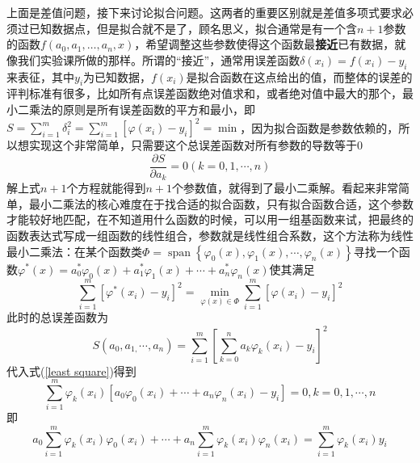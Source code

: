 \documentclass[12pt,a4paper,openany,twoside]{book}
\numberwithin{equation}{section}
\begin{document}
            上面是差值问题，接下来讨论拟合问题。这两者的重要区别就是差值多项式要求必须过已知数据点，但是拟合就不是了，顾名思义，拟合通常是有一个含$n+1$参数的函数$f(a_0,a_1,\dots,a_n,x)$，希望调整这些参数使得这个函数最\textbf{接近}已有数据，就像我们实验课所做的那样。所谓的“接近”，通常用误差函数$\delta(x_i)=f(x_i)-y_i$来表征，其中$y_i$为已知数据，$f(x_i)$是拟合函数在这点给出的值，而整体的误差的评判标准有很多，比如所有点误差函数绝对值求和，或者绝对值中最大的那个，最小二乘法的原则是所有误差函数的平方和最小，即$S=\sum_{i=1}^{m} \delta_{i}^{2}=\sum_{i=1}^{m}\left[\varphi\left(x_{i}\right)-y_{i}\right]^{2}=\min$，因为拟合函数是参数依赖的，所以想实现这个非常简单，只需要这个总误差函数对所有参数的导数等于0
            \begin{equation}
              \frac{\partial S}{\partial a_{k}}=0 (k=0,1, \cdots, n)
              \label{least square}
            \end{equation}
            解上式$n+1$个方程就能得到$n+1$个参数值，就得到了最小二乘解。看起来非常简单，最小二乘法的核心难度在于找合适的拟合函数，只有拟合函数合适，这个参数才能较好地匹配，在不知道用什么函数的时候，可以用一组基函数来试，把最终的函数表达式写成一组函数的线性组合，参数就是线性组合系数，这个方法称为线性最小二乘法：在某个函数类$\Phi=\operatorname{span}\left\{\varphi_{0}(x), \varphi_{1}(x), \cdots, \varphi_{n}(x)\right\}$寻找一个函数$\varphi^{*}(x)=a_{0}^{*} \varphi_{0}(x)+a_{1}^{*} \varphi_{1}(x)+\cdots+a_{n}^{*} \varphi_{n}(x)$使其满足
            \begin{equation}
              \sum_{i=1}^{m}\left[\varphi^{*}\left(x_{i}\right)-y_{i}\right]^{2}=\min _{\varphi(x) \in \Phi} \sum_{i=1}^{m}\left[\varphi\left(x_{i}\right)-y_{i}\right]^{2}
            \end{equation}
            此时的总误差函数为
            \begin{equation}
              S\left(a_{0}, a_{1,} \cdots, a_{n}\right)=\sum_{i=1}^{m}\left[\sum_{k=0}^{n} a_{k} \varphi_{k}\left(x_{i}\right)-y_{i}\right]^{2}
            \end{equation}
            代入式(\ref{least square})得到
            \begin{equation}
              \sum_{i=1}^{m} \varphi_{k}\left(x_{i}\right)\left[a_{0} \varphi_{0}\left(x_{i}\right)+\cdots+a_{n} \varphi_{n}\left(x_{i}\right)-y_{i}\right]=0, k=0,1, \cdots, n
            \end{equation}
            即
            \begin{equation}
              a_{0} \sum_{i=1}^{m} \varphi_{k}\left(x_{i}\right) \varphi_{0}\left(x_{i}\right)+\cdots+a_{n} \sum_{i=1}^{m} \varphi_{k}\left(x_{i}\right) \varphi_{n}\left(x_{i}\right)=\sum_{i=1}^{m} \varphi_{k}\left(x_{i}\right) y_{i}
            \end{equation}
\end{document}

